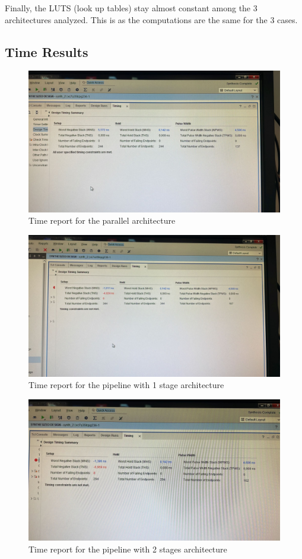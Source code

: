 \documentclass[a4paper, 12pt]{article}
\begin{document}
Finally, the LUTS (look up tables) stay almost constant among the 3 architectures analyzed. This is as the computations are the same for the 3 cases.
\subsection{Time Results}
\label{sec:orge70d2b5}
\begin{figure}[htbp]
\centering
\includegraphics[width=.9\linewidth]{./img/time_report_parallel.jpg}
\caption{Time report for the parallel architecture}
\end{figure}

\begin{figure}[htbp]
\centering
\includegraphics[width=.9\linewidth]{./img/time_report_pipeline_simple.jpg}
\caption{Time report for the pipeline with 1 stage architecture}
\end{figure}

\begin{figure}[htbp]
\centering
\includegraphics[width=.9\linewidth]{./img/time_report_pipeline.jpg}
\caption{Time report for the pipeline with 2 stages architecture}
\end{figure}
\end{document}
